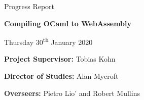 \documentclass[12pt]{article}
\begin{document}
	
	
	\medskip
	\medskip
	
	\vspace{0.5in}
	
	\centerline{\large Progress Report}
	\vspace{0.4in}
	\centerline{\Large\bf Compiling OCaml to WebAssembly}
	\vspace{0.3in}
	\centerline{\large{Thursday 30\textsuperscript{th} January 2020}}
	
	\vspace{0.5in}
	
	{\bf Project Supervisor:} Tobias Kohn
	
	\vspace{0.2in}
	
	{\bf Director of Studies:}  Alan Mycroft
	
	\vspace{0.2in}
	
	{\bf Overseers:} Pietro Lio' and Robert Mullins
	
	\vspace{0.2in}
	
\end{document}
